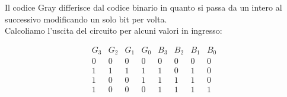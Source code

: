 \documentclass[10pt, a4paper, italian]{article}
\begin{document}
\newline
\newline
Il codice Gray differisce dal codice binario in quanto si passa da un intero al successivo modificando un solo bit per volta.\\
Calcoliamo l'uscita del circuito per alcuni valori in ingresso:
\begin{table}[htb!]
    \centering
    \[
    \begin{array}{cccc|cccc}
        G_3 & G_2 & G_1 & G_0 & B_3 & B_2 & B_1 & B_0\\
        \hline
        0 & 0 & 0 & 0 & 0 & 0 & 0 & 0\\
        1 & 1 & 1 & 1 & 1 & 0 & 1 & 0\\
        1 & 0 & 0 & 1 & 1 & 1 & 1 & 0\\
        1 & 0 & 0 & 0 & 1 & 1 & 1 & 1\\
    \end{array}
    \]
\end{table}
\end{document}
